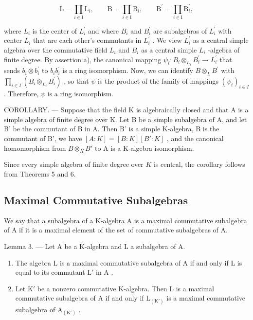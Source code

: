 \[
\mathrm{L} = \prod_ {i \in \mathrm{I}} \mathrm{L} _ {i}, \qquad \mathrm{B} = \prod_ {i \in \mathrm{I}} \mathrm{B} _ {i}, \qquad \mathrm{B} ^ {\prime} = \prod_ {i \in \mathrm{I}} \mathrm{B} _ {i} ^ {\prime},
\]

where \(L_{i}\) is the center of \(L_{i}^{\prime}\) and where \(B_{i}\) and \(B_{i}^{\prime}\) are subalgebras of \(L_{i}^{\prime}\) with center \(L_{i}\) that are each other's commutants in \(L_{i}^{\prime}\) . We view \(L_{i}^{\prime}\) as a central simple algebra over the commutative field \(L_{i}\) and \(B_{i}\) as a central simple \(L_{i}\) -algebra of finite degree. By assertion a), the canonical mapping \(\psi_{i}: B_{i} \otimes_{L_{i}} B_{i}^{\prime} \to L_{i}^{\prime}\) that sends \(b_{i} \otimes b_{i}^{\prime}\) to \(b_{i}b_{i}^{\prime}\) is a ring isomorphism. Now, we can identify \(B \otimes_{L} B^{\prime}\) with \(\prod_{i \in I}(B_{i} \otimes_{L_{i}} B_{i}^{\prime})\) , so that \(\psi\) is the product of the family of mappings \((\psi_{i})_{i \in I}\) . Therefore, \(\psi\) is a ring isomorphism.

COROLLARY. --- Suppose that the field K is algebraically closed and that A is a simple algebra of finite degree over K. Let B be a simple subalgebra of A, and let B' be the commutant of B in A. Then B' is a simple K-algebra, B is the commutant of B', we have \([A:K]=[B:K][B':K]\) , and the canonical homomorphism from \(B\otimes_{K}B'\) to A is a K-algebra isomorphism.

Since every simple algebra of finite degree over \(K\) is central, the corollary follows from Theorems 5 and 6.

\subsection{Maximal Commutative Subalgebras}

We say that a subalgebra of a K-algebra A is a maximal commutative subalgebra of A if it is a maximal element of the set of commutative subalgebras of A.

Lemma 3. --- Let A be a K-algebra and L a subalgebra of A.

\begin{enumerate}
\def\labelenumi{\alph{enumi})}
\item
  The algebra \(\mathrm{L}\) is a maximal commutative subalgebra of \(\mathrm{A}\) if and only if \(\mathrm{L}\) is equal to its commutant \(\mathrm{L}'\) in \(\mathrm{A}\) .
\item
  Let \(\mathrm{K}'\) be a nonzero commutative K-algebra. Then \(\mathrm{L}\) is a maximal commutative subalgebra of A if and only if \(\mathrm{L}_{(\mathrm{K}')}\) is a maximal commutative subalgebra of \(\mathrm{A}_{(\mathrm{K}')}\) .
\end{enumerate}

